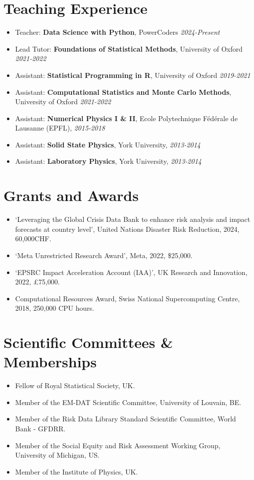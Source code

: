 \documentclass[a4paper,10pt]{article}
\begin{document}
\section*{Teaching Experience}
\begin{itemize}[leftmargin=*,noitemsep]
    \item Teacher: \textbf{Data Science with Python}, PowerCoders \textit{2024-Present} 
    \item Lead Tutor: \textbf{Foundations of Statistical Methods}, University of Oxford \textit{2021-2022} 
    \item Assistant: \textbf{Statistical Programming in R}, University of Oxford \textit{2019-2021} 
    \item Assistant: \textbf{Computational Statistics and Monte Carlo Methods}, University of Oxford \textit{2021-2022} \item Assistant: \textbf{Numerical Physics I \& II}, Ecole Polytechnique Fédérale de Lausanne (EPFL), \textit{2015-2018} 
    \item Assistant: \textbf{Solid State Physics}, York University, \textit{2013-2014} 
    \item Assistant: \textbf{Laboratory Physics}, York University, \textit{2013-2014}     
\end{itemize}
\section*{Grants and Awards}
\begin{itemize}[leftmargin=*,noitemsep]
  \item `Leveraging the Global Crisis Data Bank to enhance risk analysis and impact forecasts at country level', United Nations Disaster Risk Reduction, 2024, 60,000CHF.
  \item `Meta Unrestricted Research Award', Meta, 2022, \$25,000.
  \item `EPSRC Impact Acceleration Account (IAA)', UK Research and Innovation, 2022, £75,000.
  \item Computational Resources Award, Swiss National Supercomputing Centre, 2018, 250,000 CPU hours.
\end{itemize}

\section*{Scientific Committees \& Memberships}
\begin{itemize}[leftmargin=*,noitemsep]
  \item Fellow of Royal Statistical Society, UK.
  \item Member of the EM-DAT Scientific Committee, University of Louvain, BE.
  \item Member of the Risk Data Library Standard Scientific Committee, World Bank - GFDRR.
  \item Member of the Social Equity and Risk Assessment Working Group, University of Michigan, US.
  \item Member of the Institute of Physics, UK.
\end{itemize}
\end{document}
